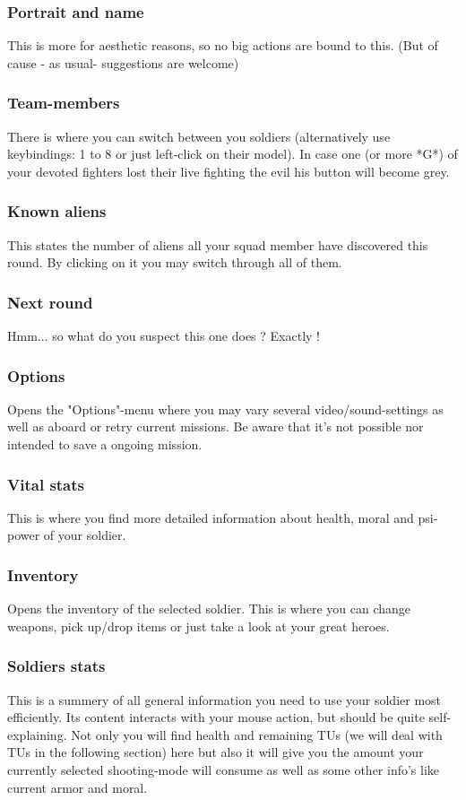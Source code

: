 \subsubsection{Portrait and name}
This is more for aesthetic reasons, so no big actions are bound to this. (But of cause - as usual- suggestions are welcome)
\subsubsection{Team-members}
There is where you can switch between you soldiers (alternatively use keybindings: 1 to 8 or just left-click on their model). In case one (or more *G*) of your devoted fighters lost their live fighting the evil his button will become grey.
\subsubsection{Known aliens}
This states the number of aliens all your squad member have discovered this round. By clicking on it you may switch through all of them.
\subsubsection{Next round}
Hmm... so what do you suspect this one does ? Exactly !
\subsubsection{Options}
Opens the "Options"-menu where you may vary several video/sound-settings as well as aboard or retry current missions. Be aware that it's not possible nor intended to save a ongoing mission.
\subsubsection{Vital stats}
This is where you find more detailed information about health, moral and psi-power of your soldier.
\subsubsection{Inventory}
Opens the inventory of the selected soldier. This is where you can change weapons, pick up/drop items or just take a look at your great heroes.
\subsubsection{Soldiers stats}
This is a summery of all general information you need to use your soldier most efficiently. Its content interacts with your mouse action, but should be quite self-explaining. Not only you will find health and remaining TUs (we will deal with TUs in the following section) here but also it will give you the amount your currently selected shooting-mode will consume as well as some other info's like current armor and moral.
